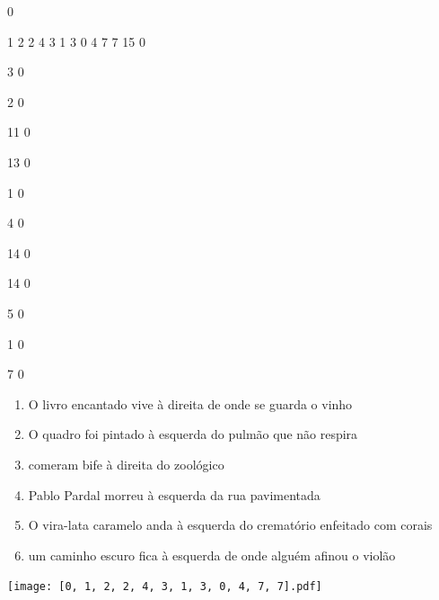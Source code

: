 \documentclass[12pt]{article}
\begin{document}
		\vfill  
		  
{
	0	%

	1	%
	2	%
	2	%
	4	%
	3	%
	1	%
	3	%
	0	%
	4	%
	7	%
	7	%
	15	%
	0	%

	3	%
	0	%

	2	%
	0	%

	11	%
	0	%

	13	%
	0	%

	1	%
	0	%

	4	%
	0	%

	14	%
	0	%

	14	%
	0	%

	5	%
	0	%

	1	%
	0	%

	7	%
	0	%

}	  
		    	

		 

\pagebreak


	\begin{enumerate}
		  \sffamily %
		  \large %


\vfill \item
O livro encantado vive	%
à direita
de onde se guarda o vinho	%

\vfill \item
O quadro foi pintado	%
à esquerda
do pulmão que não respira	%

\vfill \item
comeram bife	%
à direita
do zoológico	%

\vfill \item
Pablo Pardal morreu	%
à esquerda
da rua pavimentada	%

\vfill \item
O vira-lata caramelo anda	%
à esquerda
do crematório enfeitado com corais	%

\vfill \item
um caminho escuro fica	%
à esquerda
de onde alguém afinou o violão	%
	\end{enumerate}
		  
		  \hfill

		  \vfill

\texttt{[image: [0, 1, 2, 2, 4, 3, 1, 3, 0, 4, 7, 7].pdf]}
\end{document}
